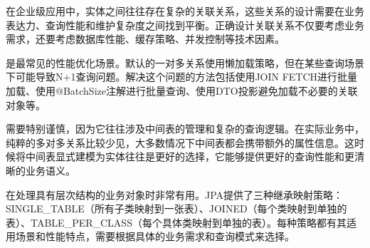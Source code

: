 在企业级应用中，实体之间往往存在复杂的关联关系，这些关系的设计需要在业务表达力、查询性能和维护复杂度之间找到平衡。正确设计关联关系不仅要考虑业务需求，还要考虑数据库性能、缓存策略、并发控制等技术因素。

是最常见的性能优化场景。默认的一对多关系使用懒加载策略，但在某些查询场景下可能导致N+1查询问题。解决这个问题的方法包括使用JOIN FETCH进行批量加载、使用@BatchSize注解进行批量查询、使用DTO投影避免加载不必要的关联对象等。

需要特别谨慎，因为它往往涉及中间表的管理和复杂的查询逻辑。在实际业务中，纯粹的多对多关系比较少见，大多数情况下中间表都会携带额外的属性信息。这时候将中间表显式建模为实体往往是更好的选择，它能够提供更好的查询性能和更清晰的业务语义。

在处理具有层次结构的业务对象时非常有用。JPA提供了三种继承映射策略：SINGLE\_TABLE（所有子类映射到一张表）、JOINED（每个类映射到单独的表）、TABLE\_PER\_CLASS（每个具体类映射到单独的表）。每种策略都有其适用场景和性能特点，需要根据具体的业务需求和查询模式来选择。

